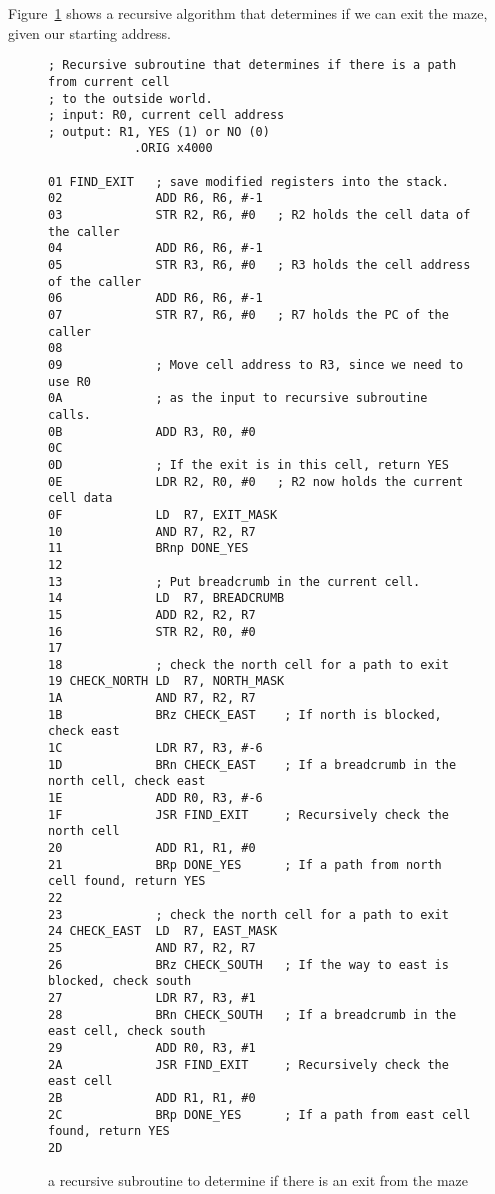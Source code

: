 \documentclass{patt}
\begin{document}
Figure~\ref{fig:maze.algorithm} shows a recursive algorithm that determines
if we can exit the maze, given our starting address.  

\begin{figure}[h!]
\begin{minipage}{36pc}
\begin{Verbatim}[fontsize=\fontsize{9}{11}\selectfont]
; Recursive subroutine that determines if there is a path from current cell
; to the outside world.
; input: R0, current cell address
; output: R1, YES (1) or NO (0)
            .ORIG x4000

01 FIND_EXIT   ; save modified registers into the stack.
02             ADD R6, R6, #-1
03             STR R2, R6, #0   ; R2 holds the cell data of the caller
04             ADD R6, R6, #-1
05             STR R3, R6, #0   ; R3 holds the cell address of the caller
06             ADD R6, R6, #-1
07             STR R7, R6, #0   ; R7 holds the PC of the caller
08
09             ; Move cell address to R3, since we need to use R0
0A             ; as the input to recursive subroutine calls.
0B             ADD R3, R0, #0
0C 
0D             ; If the exit is in this cell, return YES
0E             LDR R2, R0, #0   ; R2 now holds the current cell data
0F             LD  R7, EXIT_MASK
10             AND R7, R2, R7
11             BRnp DONE_YES
12 
13             ; Put breadcrumb in the current cell.
14             LD  R7, BREADCRUMB
15             ADD R2, R2, R7
16             STR R2, R0, #0
17 
18             ; check the north cell for a path to exit
19 CHECK_NORTH LD  R7, NORTH_MASK
1A             AND R7, R2, R7
1B             BRz CHECK_EAST    ; If north is blocked, check east
1C             LDR R7, R3, #-6
1D             BRn CHECK_EAST    ; If a breadcrumb in the north cell, check east
1E             ADD R0, R3, #-6
1F             JSR FIND_EXIT     ; Recursively check the north cell
20             ADD R1, R1, #0
21             BRp DONE_YES      ; If a path from north cell found, return YES
22 
23             ; check the north cell for a path to exit
24 CHECK_EAST  LD  R7, EAST_MASK
25             AND R7, R2, R7
26             BRz CHECK_SOUTH   ; If the way to east is blocked, check south
27             LDR R7, R3, #1
28             BRn CHECK_SOUTH   ; If a breadcrumb in the east cell, check south
29             ADD R0, R3, #1
2A             JSR FIND_EXIT     ; Recursively check the east cell
2B             ADD R1, R1, #0
2C             BRp DONE_YES      ; If a path from east cell found, return YES
2D 
\end{Verbatim}
\caption{a recursive subroutine to determine if there is an exit from the maze}
\label{fig:maze.algorithm}
\end{minipage}
\end{figure}
\end{document}
